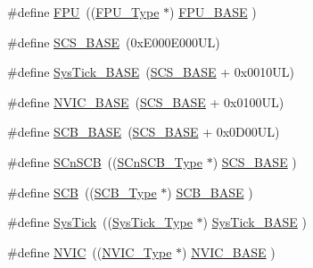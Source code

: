 \begin{DoxyCompactItemize}
\#define \hyperlink{group___c_m_s_i_s__core__base_gabc7c93f2594e85ece1e1a24f10591428}{F\+PU}~((\hyperlink{struct_f_p_u___type}{F\+P\+U\+\_\+\+Type}       $\ast$)     \hyperlink{group___c_m_s_i_s__core__base_ga4dcad4027118c098c07bcd575f1fbb28}{F\+P\+U\+\_\+\+B\+A\+SE}      )
\item 
\#define \hyperlink{group___c_m_s_i_s__core__base_ga3c14ed93192c8d9143322bbf77ebf770}{S\+C\+S\+\_\+\+B\+A\+SE}~(0x\+E000\+E000\+U\+L)
\item 
\#define \hyperlink{group___c_m_s_i_s__core__base_ga58effaac0b93006b756d33209e814646}{Sys\+Tick\+\_\+\+B\+A\+SE}~(\hyperlink{group___c_m_s_i_s__core__base_ga3c14ed93192c8d9143322bbf77ebf770}{S\+C\+S\+\_\+\+B\+A\+SE} +  0x0010\+U\+L)
\item 
\#define \hyperlink{group___c_m_s_i_s__core__base_gaa0288691785a5f868238e0468b39523d}{N\+V\+I\+C\+\_\+\+B\+A\+SE}~(\hyperlink{group___c_m_s_i_s__core__base_ga3c14ed93192c8d9143322bbf77ebf770}{S\+C\+S\+\_\+\+B\+A\+SE} +  0x0100\+U\+L)
\item 
\#define \hyperlink{group___c_m_s_i_s__core__base_gad55a7ddb8d4b2398b0c1cfec76c0d9fd}{S\+C\+B\+\_\+\+B\+A\+SE}~(\hyperlink{group___c_m_s_i_s__core__base_ga3c14ed93192c8d9143322bbf77ebf770}{S\+C\+S\+\_\+\+B\+A\+SE} +  0x0\+D00\+U\+L)
\item 
\#define \hyperlink{group___c_m_s_i_s__core__base_ga9fe0cd2eef83a8adad94490d9ecca63f}{S\+Cn\+S\+CB}~((\hyperlink{struct_s_cn_s_c_b___type}{S\+Cn\+S\+C\+B\+\_\+\+Type}    $\ast$)     \hyperlink{group___c_m_s_i_s__core__base_ga3c14ed93192c8d9143322bbf77ebf770}{S\+C\+S\+\_\+\+B\+A\+SE}      )
\item 
\#define \hyperlink{group___c_m_s_i_s__core__base_gaaaf6477c2bde2f00f99e3c2fd1060b01}{S\+CB}~((\hyperlink{struct_s_c_b___type}{S\+C\+B\+\_\+\+Type}       $\ast$)     \hyperlink{group___c_m_s_i_s__core__base_gad55a7ddb8d4b2398b0c1cfec76c0d9fd}{S\+C\+B\+\_\+\+B\+A\+SE}      )
\item 
\#define \hyperlink{group___c_m_s_i_s__core__base_gacd96c53beeaff8f603fcda425eb295de}{Sys\+Tick}~((\hyperlink{struct_sys_tick___type}{Sys\+Tick\+\_\+\+Type}   $\ast$)     \hyperlink{group___c_m_s_i_s__core__base_ga58effaac0b93006b756d33209e814646}{Sys\+Tick\+\_\+\+B\+A\+SE}  )
\item 
\#define \hyperlink{group___c_m_s_i_s__core__base_gac8e97e8ce56ae9f57da1363a937f8a17}{N\+V\+IC}~((\hyperlink{struct_n_v_i_c___type}{N\+V\+I\+C\+\_\+\+Type}      $\ast$)     \hyperlink{group___c_m_s_i_s__core__base_gaa0288691785a5f868238e0468b39523d}{N\+V\+I\+C\+\_\+\+B\+A\+SE}     )

\end{DoxyCompactItemize}
